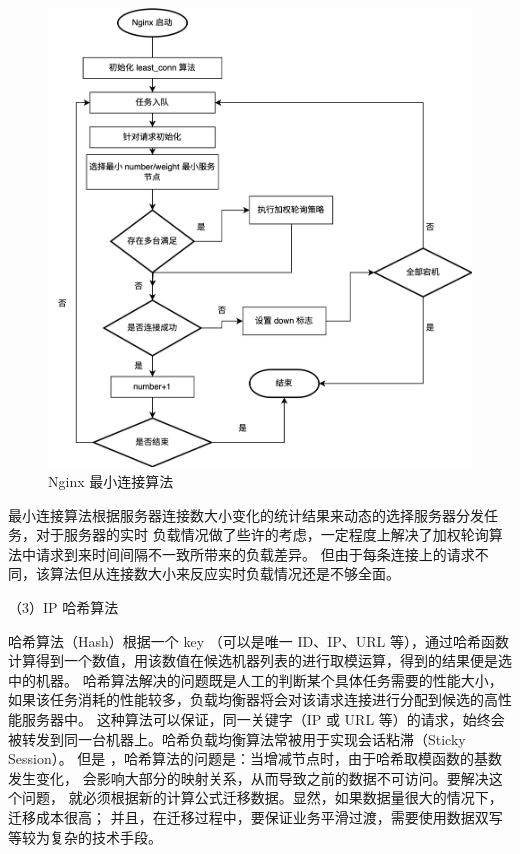 \begin{figure}[htb]
  \centering
  \includegraphics[width=\textwidth]{figures/least-flowchart.png}
  \caption{Nginx 最小连接算法}
  \label{minlinkconnection}
\end{figure}

最小连接算法根据服务器连接数大小变化的统计结果来动态的选择服务器分发任务，对于服务器的实时
负载情况做了些许的考虑，一定程度上解决了加权轮询算法中请求到来时间间隔不一致所带来的负载差异。
但由于每条连接上的请求不同，该算法但从连接数大小来反应实时负载情况还是不够全面。

（3）IP 哈希算法

哈希算法（Hash）根据一个 key （可以是唯一 ID、IP、URL 等），通过哈希函数计算得到一个数值，用该数值在候选机器列表的进行取模运算，得到的结果便是选中的机器\cite{邱亚飞2021哈希算法的实现与验证}。
哈希算法解决的问题既是人工的判断某个具体任务需要的性能大小，如果该任务消耗的性能较多，负载均衡器将会对该请求连接进行分配到候选的高性能服务器中。
这种算法可以保证，同一关键字（IP 或 URL 等）的请求，始终会被转发到同一台机器上。哈希负载均衡算法常被用于实现会话粘滞（Sticky Session）。
但是 ，哈希算法的问题是：当增减节点时，由于哈希取模函数的基数发生变化，
会影响大部分的映射关系，从而导致之前的数据不可访问。要解决这个问题，
就必须根据新的计算公式迁移数据。显然，如果数据量很大的情况下，迁移成本很高；
并且，在迁移过程中，要保证业务平滑过渡，需要使用数据双写等较为复杂的技术手段。

